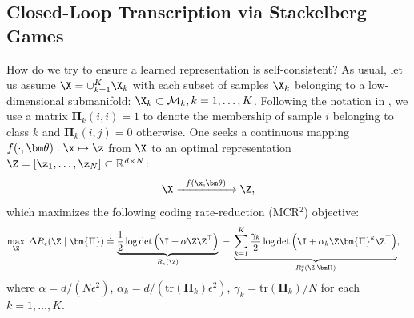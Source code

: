\documentclass[../../book-main.tex]{subfiles}
\begin{document}
\subsection{Closed-Loop Transcription via Stackelberg
Games}\label{sec:closed-loop-transcription}

How do we try to ensure a learned representation is self-consistent?
As usual, let us assume $\X = \cup_{k=1}^K \X_k$ with each subset of
samples $\X_k$ belonging to a low-dimensional submanifold: $\X_k
\subset \mathcal{M}_k, k = 1,\ldots, K$. Following the notation in
, we use a matrix $\bm \Pi_k(i,i) = 1$ to denote
the membership of sample $i$ belonging to class $k$ and $\bm
\Pi_k(i,j) = 0$ otherwise. One seeks a continuous mapping
$f(\cdot,\bm \theta): \x \mapsto \z$ from $\X$ to an optimal
representation $\Z = [\z_1, \ldots, \z_N] \subset \mathbb{R}^{d \times N}$:
\begin{equation}
    \X  \xrightarrow{\hspace{2mm} f(\x, \bm \theta) \hspace{2mm}} \Z,
    \label{eqn:LDR}
\end{equation}
which maximizes the following coding rate-reduction (MCR$^2$) objective:
\begin{equation}\label{eq:mcr2-formulation}
    \begin{split}
        \max_{\Z} \; \Delta R_\epsilon(\Z  \mid \bm{\Pi}) %
        &\doteq \underbrace{\frac{1}{2}\log\det \Big(\I + {\alpha} \Z
        \Z^\top \Big)}_{R_{\epsilon}(\Z)} \;-\;
        \underbrace{\sum_{k=1}^{K}\frac{\gamma_k}{2} \log\det\Big(\I
                + {\alpha_k} \Z \bm{\Pi}^{k} \Z^\top
        \Big)}_{R^c_{\epsilon}(\Z \mid \bm \Pi)},
    \end{split}
\end{equation}
where $\alpha = {d}/({N\epsilon^2})$, $\alpha_k =
d/({\mathrm{tr}(\bm{\Pi}_k)\epsilon^2})$, $\gamma_k =
{\mathrm{tr}(\bm{\Pi}_{k})}/{N}$ for each $k = 1,\dots, K$.
\end{document}

